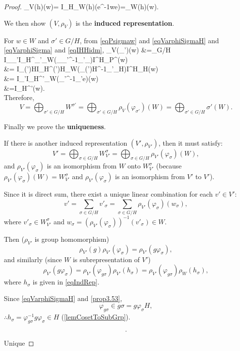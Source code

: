 \documentclass[12pt, letterpaper]{article}
\newcommand{\red}[1]{{\color{red} #1}}
\newenvironment{eqlong}{\equation\aligned}{\endaligned\endequation}
\theoremstyle{definition}
\theoremstyle{remark}
\theoremstyle{definition}
\theoremstyle{plain}
\numberwithin{equation}{section}
\begin{document}
\begin{proof}
		\begin{eqlong}		
			\rho_V(h)(w)=
			I_H\circ\rho_W(h)(e^{-1}we)=\rho_W(h)(w).
		\end{eqlong}
		
		We then show $(V,\rho_V)$ is the \textbf{induced representation}.
		
		For $w\in W$ and $\sigma'\in G/H$,
		from \eqref{eqPsigmaw} and \eqref{eqVarphiSigmaH} and \eqref{eqVarphiSigma} and \eqref{eqIHHidm},
		\begin{eqlong}
			\rho_V(\varphi_{\sigma'})(w) 
			&=\sum_{\sigma\in G/H} I_{\varphi_{\sigma'}\sigma}\circ I_{H}^{\varphi_{\sigma'}\sigma}\circ \rho_W(\varphi_{\varphi_{\sigma'}\sigma}^{-1}\varphi_{\sigma'}\varphi_{\sigma})\circ I^{H}_{\sigma}\circ P^\sigma(w)\\
			&= I_{\varphi(\sigma')H}\circ I_{H}^{\varphi(\sigma')H}\circ \rho_W(\varphi_{\varphi(\sigma')H}^{-1}\varphi_{\sigma'}\varphi_{H})\circ I^{H}_{H}(w)\\
			&= I_{\sigma'}\circ I_{H}^{\sigma'}\circ \rho_W(\varphi_{\sigma'}^{-1}\varphi_{\sigma'}e)(w)\\
			&=I_{H}^{\sigma'}(w).\\
		\end{eqlong}
		 Therefore,
		\[V=\bigoplus_{\sigma'\in G/H}W^{\sigma'}=\bigoplus_{\sigma'\in G/H}\rho_V(\varphi_{\sigma'})(W)=\bigoplus_{\sigma'\in G/H}\sigma'(W). \]
		
		Finally we prove the \textbf{uniqueness}.
		
		If there is another induced representation $(V',\rho_{V'})$, then it must satisfy:
		\[V'=\bigoplus_{\sigma\in G/H} W^{\sigma}_{V'}=\bigoplus_{\sigma\in G/H}\rho_{V'}(\varphi_\sigma)(W),\]
		and $\rho_{V'}(\varphi_\sigma)$ is an isomorphism from $W$ onto $W^{\sigma}_{V'}$
		(because $\rho_{V'}(\varphi_\sigma)(W)=W^{\sigma}_{V'}$ and $\rho_{V'}(\varphi_\sigma)$
		is an isomorphism from $V'$ to $V'$).
		
		Since it is direct sum, there exist a unique linear combination for each $v'\in V'$:
		\[ v' = \sum_{\sigma\in G/H} v'_\sigma=\sum_{\sigma\in G/H} \rho_{V'}(\varphi_\sigma)(w_\sigma),\]
		where $v'_\sigma\in W^{\sigma}_{V'}$ and $w_\sigma=(\rho_{V'}(\varphi_\sigma))^{-1}(v'_\sigma)\in W$.
		
		Then ($\rho_{V'}$ is group homomorphism)
		\[\rho_{V'}(g)\rho_{V'}(\varphi_\sigma)= \rho_{V'}(g\varphi_\sigma),\]
		and similarly (since $W$ is subrepresentation of $V'$)
		\[ \rho_{V'}(g\varphi_\sigma)=\rho_{V'}(\varphi_{g\sigma})\rho_{V'}({h_\sigma})
		=\rho_{V'}(\varphi_{g\sigma})\rho_{W}({h_\sigma}),\]
		where $h_\sigma$ is given in \eqref{eqIndRep}.
		
		Since \eqref{eqVarphiSigmaH} and \ref{prop3.53},
		\[\varphi_{g\sigma}\in g\sigma=g\varphi_\sigma H,\]
		$\therefore h_\sigma=\varphi_{g\sigma}^{-1}g\varphi_\sigma\in H$ (\ref{lemCosetToSubGrp}).
		
		\[.\]
		
		\red{Unique}
		
	\end{proof}
	
\end{document}

